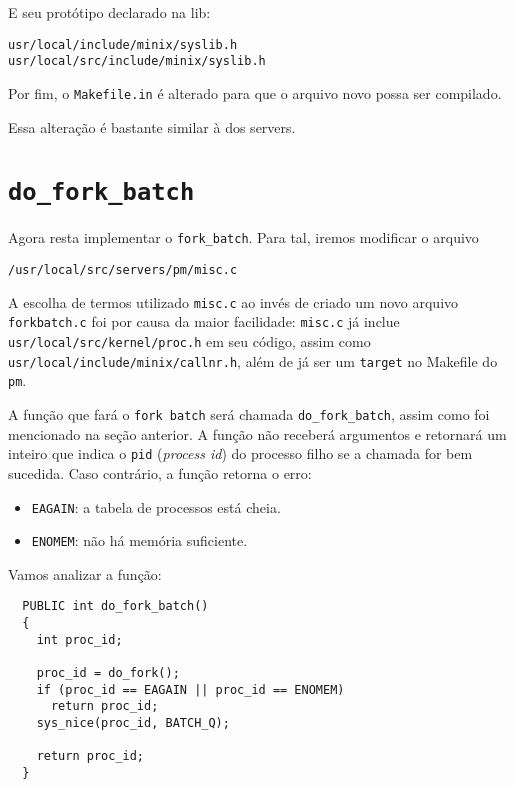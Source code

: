 \documentclass{amsart}
\theoremstyle{plain}
\newcommand{\code}[1]{\lstinline[mathescape=true]{#1}}
\begin{document}
E seu protótipo declarado na lib:

\begin{lstlisting}[frame=leftline,mathescape=true,style=nonumbers]
usr/local/include/minix/syslib.h
usr/local/src/include/minix/syslib.h
\end{lstlisting}

Por fim, o \code{Makefile.in} é alterado para que o arquivo novo possa ser compilado.

Essa alteração é bastante similar à dos servers.

\section{\code{do_fork_batch}}

Agora resta implementar o \code{fork_batch}. Para tal, iremos modificar o arquivo

\begin{lstlisting}[frame=leftline,mathescape=true,style=nonumbers]
/usr/local/src/servers/pm/misc.c
\end{lstlisting}

A escolha de termos utilizado \code{misc.c} ao invés de criado um novo arquivo \code{forkbatch.c}
foi por causa da maior facilidade: \code{misc.c} já inclue \code{usr/local/src/kernel/proc.h} em
seu código, assim como \code{usr/local/include/minix/callnr.h}, além de já ser um \code{target} no
Makefile do \code{pm}.

A função que fará o \code{fork batch} será chamada \code{do_fork_batch}, assim como foi mencionado
na seção anterior. A função não receberá argumentos e retornará um inteiro que indica o
\code{pid} (\textit{process id}) do processo filho se a chamada for bem sucedida. Caso contrário,
a função retorna o erro:

\begin{itemize}
  \item \code{EAGAIN}: a tabela de processos está cheia.
  \item \code{ENOMEM}: não há memória suficiente.
\end{itemize}

Vamos analizar a função:
\newpage

\begin{verbatim}
  PUBLIC int do_fork_batch()
  {
    int proc_id;

    proc_id = do_fork();
    if (proc_id == EAGAIN || proc_id == ENOMEM)
      return proc_id;
    sys_nice(proc_id, BATCH_Q);

    return proc_id;
  }
\end{verbatim}
\end{document}
